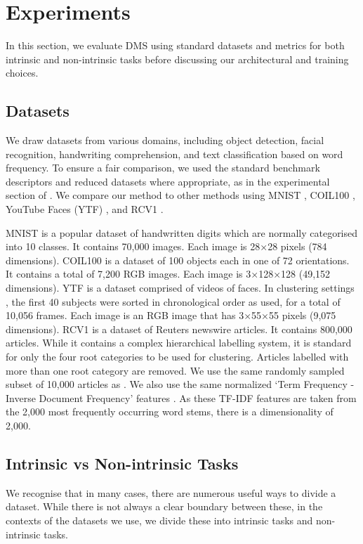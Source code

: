 \documentclass[../thesis.tex]{subfiles}
\begin{document}
\section{Experiments}\label{sec__DMS__experiments}
In this section, we evaluate DMS using standard datasets and metrics for both intrinsic and non-intrinsic tasks before discussing our architectural and training choices. 

\subsection{Datasets}
We draw datasets from various domains, including object detection, facial recognition, handwriting comprehension, and text classification based on word frequency. To ensure a fair comparison, we used the standard benchmark descriptors and reduced datasets where appropriate, as in the experimental section of \citet{shah2018deep}.
We compare our method to other methods using MNIST \cite{LeCun1998},  COIL100 \cite{Nene1996}, YouTube Faces (YTF) \cite{Wolf2011}, and RCV1 \cite{Lewis2004}.

MNIST is a popular dataset of handwritten digits which are normally categorised into 10 classes. It contains 70,000 images. Each image is 28×28 pixels (784 dimensions).
COIL100 is a dataset of 100 objects each in one of 72 orientations. It contains a total of 7,200 RGB images. Each image is 3×128×128 (49,152 dimensions).
YTF is a dataset comprised of videos of faces. In clustering settings \cite{shah2018deep, Shah2018}, the first 40 subjects were sorted in chronological order as used, for a total of 10,056 frames. Each image is an RGB image that has 3×55×55 pixels (9,075 dimensions).
RCV1 is a dataset of Reuters newswire articles. It contains  800,000 articles. While it contains a complex hierarchical labelling system, it is standard for only the four root categories to be used for clustering. Articles labelled with more than one root category are removed. We use the same randomly sampled subset of 10,000 articles as \citet{shah2018deep}. We also use the same normalized `Term Frequency - Inverse Document Frequency' features \cite{sparck1972-tfidf}. As these TF-IDF features are taken from the 2,000 most frequently occurring word stems, there is a dimensionality of 2,000.



\subsection{Intrinsic vs Non-intrinsic Tasks}
We recognise that in many cases, there are numerous useful ways to divide a dataset. 
While there is not always a clear boundary between these, in the contexts of the datasets we use, we divide these into intrinsic tasks and non-intrinsic tasks.
\end{document}
